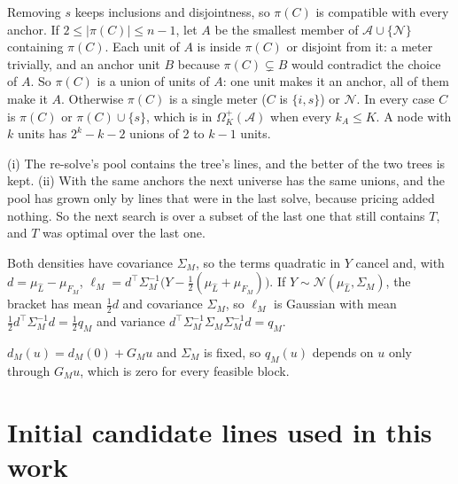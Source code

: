 \documentclass[journal,onecolumn,11pt]{IEEEtran}
\newcommand{\tp}{^{\top}}
\newcommand{\Nset}{\mathcal{N}}
\newcommand{\Aset}{\mathcal{A}}
\begin{document}
\begin{IEEEproof}
Removing $s$ keeps inclusions and disjointness, so $\pi(C)$ is compatible with every anchor. If $2\le|\pi(C)|\le n-1$, let
$A$ be the smallest member of $\Aset\cup\{\Nset\}$ containing $\pi(C)$. Each unit of $A$ is inside $\pi(C)$ or disjoint from
it: a meter trivially, and an anchor unit $B$ because $\pi(C)\subsetneq B$ would contradict the choice of $A$. So $\pi(C)$ is
a union of units of $A$: one unit makes it an anchor, all of them make it $A$. Otherwise $\pi(C)$ is a single meter ($C$ is
$\{i,s\}$) or $\Nset$. In every case $C$ is $\pi(C)$ or $\pi(C)\cup\{s\}$, which is in $\Omega^+_K(\Aset)$ when every
$k_A\le K$. A node with $k$ units has $2^k-k-2$ unions of 2 to $k-1$ units.
\end{IEEEproof}

\begin{IEEEproof}
(i) The re-solve's pool contains the tree's lines, and the better of the two trees is kept. (ii) With the same anchors the
next universe has the same unions, and the pool has grown only by lines that were in the last solve, because pricing added
nothing. So the next search is over a subset of the last one that still contains $T$, and $T$ was optimal over the last one.
\end{IEEEproof}

\begin{IEEEproof}
Both densities have covariance $\Sigma_M$, so the terms quadratic in $Y$ cancel and, with $d=\mu_{\hat L}-\mu_{F_M}$,
$\ell_M=d\tp\Sigma_M^{-1}\big(Y-\tfrac12(\mu_{\hat L}+\mu_{F_M})\big)$. If $Y\sim\mathcal N(\mu_{\hat L},\Sigma_M)$, the
bracket has mean $\tfrac12d$ and covariance $\Sigma_M$, so $\ell_M$ is Gaussian with mean $\tfrac12d\tp\Sigma_M^{-1}d=
\tfrac12q_M$ and variance $d\tp\Sigma_M^{-1}\Sigma_M\Sigma_M^{-1}d=q_M$.
\end{IEEEproof}

\begin{IEEEproof}
$d_M(u)=d_M(0)+G_Mu$ and $\Sigma_M$ is fixed, so $q_M(u)$ depends on $u$ only through $G_Mu$, which is zero for every
feasible block.
\end{IEEEproof}

\section{Initial candidate lines used in this work}\label{app:pool}
\end{document}
